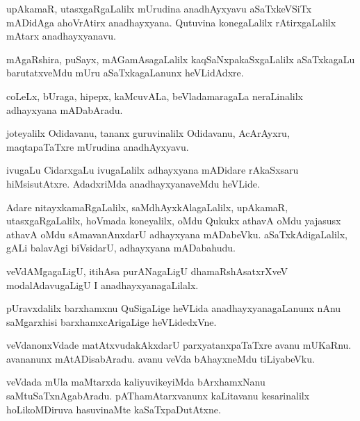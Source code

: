 \documentclass{article}
\begin{document}
\begin{mn}
upAkamaR, utasxgaRgaLalilx mUrudina anadhAyxyavu aSaTxkeVSiTx mADidAga ahoVrAtirx anadhayxyana.
Qutuvina konegaLalilx rAtirxgaLalilx mAtarx anadhayxyanavu.
\end{mn}

\begin{mn}
mAgaRshira, puSayx, mAGamAsagaLalilx kaqSaNxpakaSxgaLalilx aSaTxkagaLu barutatxveMdu mUru 
aSaTxkagaLanunx heVLidAdxre.
\end{mn}

\begin{mn}
coLeLx, bUraga, hipepx, kaMcuvALa, beVladamaragaLa neraLinalilx adhayxyana mADabAradu.
\end{mn}

\begin{mn}
joteyalilx Odidavanu, tananx guruvinalilx Odidavanu, AcArAyxru, maqtapaTaTxre mUrudina 
anadhAyxyavu.
\end{mn}

\begin{mn}
ivugaLu CidarxgaLu ivugaLalilx adhayxyana mADidare rAkaSxsaru hiMsisutAtxre. AdadxriMda 
anadhayxyanaveMdu heVLide.
\end{mn}

\begin{mn}
Adare nitayxkamaRgaLalilx, saMdhAyxkAlagaLalilx, upAkamaR, utasxgaRgaLalilx, hoVmada koneyalilx, 
oMdu Qukukx athavA oMdu yajasusx athavA oMdu sAmavanAnxdarU adhayxyana mADabeVku. 
aSaTxkAdigaLalilx, gALi balavAgi biVsidarU, adhayxyana mADabahudu. 
\end{mn}

\begin{mn}
veVdAMgagaLigU, itihAsa purANagaLigU dhamaRshAsatxrXveV modalAdavugaLigU I anadhayxyanagaLilalx.
\end{mn}

\begin{mn}
pUravxdalilx barxhamxnu QuSigaLige heVLida anadhayxyanagaLanunx  nAnu saMgarxhisi 
barxhamxcArigaLige heVLidedxVne.
\end{mn}

\begin{mn}
veVdanonxVdade matAtxvudakAkxdarU parxyatanxpaTaTxre avanu mUKaRnu. avananunx mAtADisabAradu. avanu
veVda bAhayxneMdu tiLiyabeVku.
\end{mn}

\begin{mn}
veVdada mUla maMtarxda kaliyuvikeyiMda bArxhamxNanu saMtuSaTxnAgabAradu. pAThamAtarxvanunx 
kaLitavanu kesarinalilx hoLikoMDiruva hasuvinaMte kaSaTxpaDutAtxne.
\end{mn}
\end{document}
